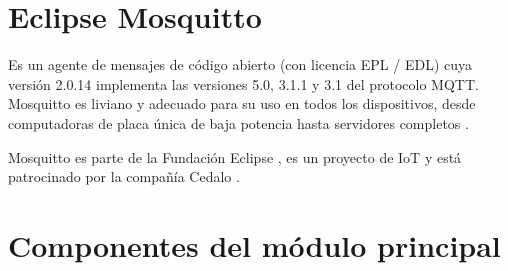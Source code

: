 \begin{itemize}

\end{itemize}





\section{Eclipse Mosquitto} 
Es un agente de mensajes de código abierto (con licencia EPL / EDL) cuya versión 2.0.14 implementa las versiones 5.0, 3.1.1 y 3.1 del protocolo MQTT. Mosquitto es liviano y adecuado para su uso en todos los dispositivos, desde computadoras de placa única de baja potencia hasta servidores completos \citep{WEBSITE:5}.


Mosquitto es parte de la Fundación Eclipse \citep{WEBSITE:5}, es un proyecto de IoT \citep{WEBSITE:39} y está patrocinado por la compañía Cedalo \citep{WEBSITE:40}. 

\section{Componentes del módulo principal} 


